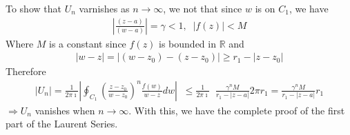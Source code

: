 \documentclass[11pt]{report}
\newcommand{\NI}{\noindent}
\newcommand{\real}{ \mathbb{R}}
\newcommand{\imaginary}{\imath}
\begin{document}
	\NI To show that $U_n$ varnishes as $n\rightarrow\infty$, we not that since $w$ is on $C_1$, we have 
	\begin{eqnarray*}
		\left|\frac{(z-a)}{(w-a)}\right| = \gamma < 1,\;\; |f(z)| < M
	\end{eqnarray*}
	Where $M$ is a constant since $f(z)$ is bounded in $\real$ and
	\begin{eqnarray*}
		|w-z| = |(w-z_0) - (z-z_0)| \geq r_1 - |z-z_0|
	\end{eqnarray*}
	Therefore
	\begin{eqnarray*}
		|U_n| = \frac{1}{2\pi\imaginary}\left|\oint_{C_1}\left(\frac{z-z_0}{w-z_0}\right)^n \frac{f(w)}{w-z}dw \right|\;\; \leq \frac{1}{2\pi\imaginary}\;\;\frac{\gamma^nM}{r_1-|z-a|}2\pi r_1 = \frac{\gamma^n M}{r_1-|z-a|}r_1
	\end{eqnarray*}
	$\Rightarrow U_n$ vanishes when $n\rightarrow\infty$. With this, we have the complete proof of the first part of the Laurent Series.\\
	
\end{document}
